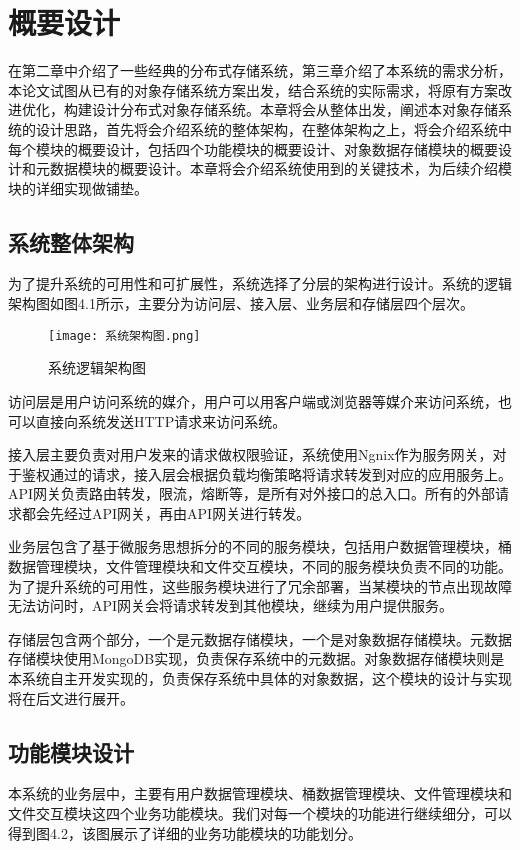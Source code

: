 
\chapter{概要设计}
在第二章中介绍了一些经典的分布式存储系统，第三章介绍了本系统的需求分析，本论文试图从已有的对象存储系统方案出发，结合系统的实际需求，将原有方案改进优化，构建设计分布式对象存储系统。本章将会从整体出发，阐述本对象存储系统的设计思路，首先将会介绍系统的整体架构，在整体架构之上，将会介绍系统中每个模块的概要设计，包括四个功能模块的概要设计、对象数据存储模块的概要设计和元数据模块的概要设计。本章将会介绍系统使用到的关键技术，为后续介绍模块的详细实现做铺垫。

\section{系统整体架构}%
为了提升系统的可用性和可扩展性，系统选择了分层的架构进行设计。系统的逻辑架构图如图4.1所示，主要分为访问层、接入层、业务层和存储层四个层次。

\begin{figure}[h]
  \centering
  \texttt{[image: 系统架构图.png]}
  \caption{系统逻辑架构图}
\end{figure}

访问层是用户访问系统的媒介，用户可以用客户端或浏览器等媒介来访问系统，也可以直接向系统发送HTTP请求来访问系统。

接入层主要负责对用户发来的请求做权限验证，系统使用Ngnix作为服务网关，对于鉴权通过的请求，接入层会根据负载均衡策略将请求转发到对应的应用服务上。API网关负责路由转发，限流，熔断等，是所有对外接口的总入口。所有的外部请求都会先经过API网关，再由API网关进行转发。

业务层包含了基于微服务思想拆分的不同的服务模块，包括用户数据管理模块，桶数据管理模块，文件管理模块和文件交互模块，不同的服务模块负责不同的功能。为了提升系统的可用性，这些服务模块进行了冗余部署，当某模块的节点出现故障无法访问时，API网关会将请求转发到其他模块，继续为用户提供服务。

存储层包含两个部分，一个是元数据存储模块，一个是对象数据存储模块。元数据存储模块使用MongoDB实现，负责保存系统中的元数据。对象数据存储模块则是本系统自主开发实现的，负责保存系统中具体的对象数据，这个模块的设计与实现将在后文进行展开。

\section{功能模块设计}
本系统的业务层中，主要有用户数据管理模块、桶数据管理模块、文件管理模块和文件交互模块这四个业务功能模块。我们对每一个模块的功能进行继续细分，可以得到图4.2，该图展示了详细的业务功能模块的功能划分。

